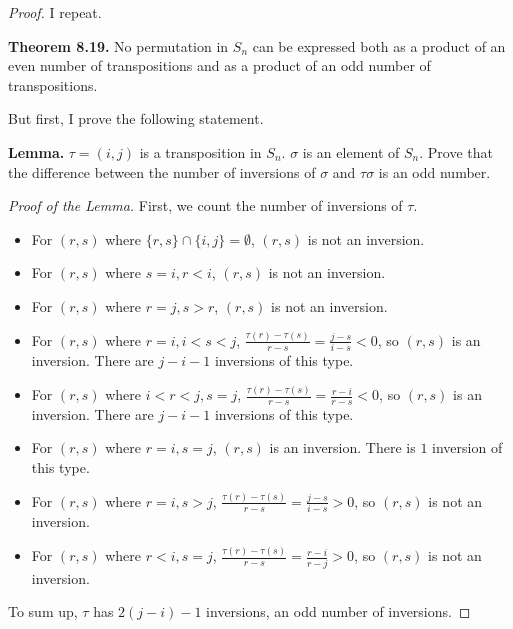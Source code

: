 \begin{proof}
    I repeat.

    \textbf{Theorem 8.19.} No permutation in $S_{n}$ can be expressed both as a product of an even number of transpositions and as a product of an odd number of transpositions.

    But first, I prove the following statement.

    \textbf{Lemma.} $\tau = (i, j)$ is a transposition in $S_{n}$. $\sigma$ is an element of $S_{n}$. Prove that the difference between the number of inversions of $\sigma$ and $\tau\sigma$ is an odd number.

    \textit{Proof of the Lemma.} First, we count the number of inversions of $\tau$.

    \begin{itemize}
        \item For $(r, s)$ where $\{ r, s \}\cap\{ i, j \} = \emptyset$, $(r, s)$ is not an inversion.
        \item For $(r, s)$ where $s = i, r < i$, $(r, s)$ is not an inversion.
        \item For $(r, s)$ where $r = j, s > r$, $(r, s)$ is not an inversion.
        \item For $(r, s)$ where $r = i, i < s < j$, $\frac{\tau(r) - \tau(s)}{r - s} = \frac{j - s}{i - s} < 0$, so $(r, s)$ is an inversion. There are $j - i - 1$ inversions of this type.
        \item For $(r, s)$ where $i < r < j, s = j$, $\frac{\tau(r) - \tau(s)}{r - s} = \frac{r - i}{r - s} < 0$, so $(r, s)$ is an inversion. There are $j - i - 1$ inversions of this type.
        \item For $(r, s)$ where $r = i, s = j$, $(r, s)$ is an inversion. There is $1$ inversion of this type.
        \item For $(r, s)$ where $r = i, s > j$, $\frac{\tau(r) - \tau(s)}{r - s} = \frac{j - s}{i - s} > 0$, so $(r, s)$ is not an inversion.
        \item For $(r, s)$ where $r < i, s = j$, $\frac{\tau(r) - \tau(s)}{r - s} = \frac{r - i}{r - j} > 0$, so $(r, s)$ is not an inversion.
    \end{itemize}

    To sum up, $\tau$ has $2(j - i) - 1$ inversions, an odd number of inversions.


\end{proof}

